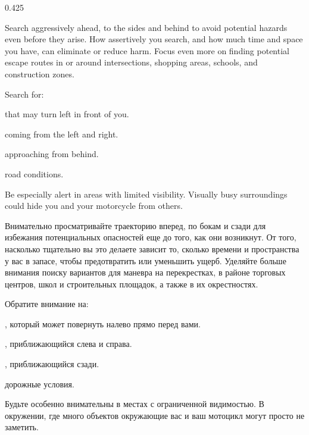 \begin{langblock}{0.425}
	\begin{eng}
	Search aggressively ahead, to the sides and behind to avoid potential hazards even before they arise. How assertively you search, and how much time and space you have, can eliminate or reduce harm. Focus even more on finding potential escape routes in or around intersections, shopping areas, schools, and construction zones.
	
	Search for:
	
	\begin{description}[noitemsep]
		\item [Oncoming traffic] that may turn left in front of you.
		\item [Traffic] coming from the left and right.
		\item [Traffic] approaching from behind.
		\item [Hazardous] road conditions.
		
	\end{description}
	
	Be especially alert in areas with limited visibility. Visually busy surroundings could hide you and your motorcycle from others.
	\end{eng}
	\begin{rus}
		Внимательно просматривайте траекторию вперед, по бокам и сзади для избежания потенциальных опасностей еще до того, как они возникнут. От того, насколько тщательно вы это делаете зависит то, сколько времени и пространства у вас в запасе, чтобы предотвратить или уменьшить ущерб. Уделяйте больше внимания поиску вариантов для маневра на перекрестках, в районе торговых центров, школ и строительных площадок, а также в их окрестностях.
		
		Обратите внимание на:
		\begin{description}[noitemsep]
		\item [Встречный транспорт], который может повернуть налево прямо перед вами.
		\item [Транспорт], приближающийся слева и справа.
		\item [Транспорт], приближающийся сзади.
		\item [Опасные] дорожные условия.
		\end{description}
		
		Будьте особенно внимательны в местах с ограниченной видимостью. В окружении, где много объектов окружающие вас и ваш мотоцикл могут просто не заметить.
\end{rus}
\end{langblock}




